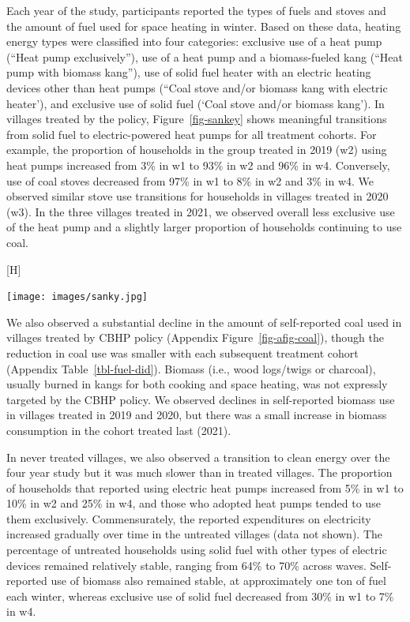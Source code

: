 \documentclass[
  letterpaper,
  DIV=11,
  numbers=noendperiod]{scrartcl}
\makeatletter
\renewenvironment{figure}%
   {\renewcommand\familydefault\sfdefault
    \@float{figure}}
   {\end@float}
\makeatother
\begin{document}
Each year of the study, participants reported the types of fuels and
stoves and the amount of fuel used for space heating in winter. Based on
these data, heating energy types were classified into four categories:
exclusive use of a heat pump (``Heat pump exclusively''), use of a heat
pump and a biomass-fueled kang (``Heat pump with biomass kang''), use of
solid fuel heater with an electric heating devices other than heat pumps
(``Coal stove and/or biomass kang with electric heater'), and exclusive
use of solid fuel (`Coal stove and/or biomass kang'). In villages
treated by the policy, Figure~\ref{fig-sankey} shows meaningful
transitions from solid fuel to electric-powered heat pumps for all
treatment cohorts. For example, the proportion of households in the
group treated in 2019 (w2) using heat pumps increased from 3\% in w1 to
93\% in w2 and 96\% in w4. Conversely, use of coal stoves decreased from
97\% in w1 to 8\% in w2 and 3\% in w4. We observed similar stove use
transitions for households in villages treated in 2020 (w3). In the
three villages treated in 2021, we observed overall less exclusive use
of the heat pump and a slightly larger proportion of households
continuing to use coal.

\begin{figure}[H]

{\centering \texttt{[image: images/sanky.jpg]}

}

\caption{\label{fig-sankey}Transitions to different energy sources
across study waves}

\end{figure}

We also observed a substantial decline in the amount of self-reported
coal used in villages treated by CBHP policy (Appendix
Figure~\ref{fig-afig-coal}), though the reduction in coal use was
smaller with each subsequent treatment cohort (Appendix
Table~\ref{tbl-fuel-did}). Biomass (i.e., wood logs/twigs or charcoal),
usually burned in kangs for both cooking and space heating, was not
expressly targeted by the CBHP policy. We observed declines in
self-reported biomass use in villages treated in 2019 and 2020, but
there was a small increase in biomass consumption in the cohort treated
last (2021).

In never treated villages, we also observed a transition to clean energy
over the four year study but it was much slower than in treated
villages. The proportion of households that reported using electric heat
pumps increased from 5\% in w1 to 10\% in w2 and 25\% in w4, and those
who adopted heat pumps tended to use them exclusively. Commensurately,
the reported expenditures on electricity increased gradually over time
in the untreated villages (data not shown). The percentage of untreated
households using solid fuel with other types of electric devices
remained relatively stable, ranging from 64\% to 70\% across waves.
Self-reported use of biomass also remained stable, at approximately one
ton of fuel each winter, whereas exclusive use of solid fuel decreased
from 30\% in w1 to 7\% in w4.
\end{document}
